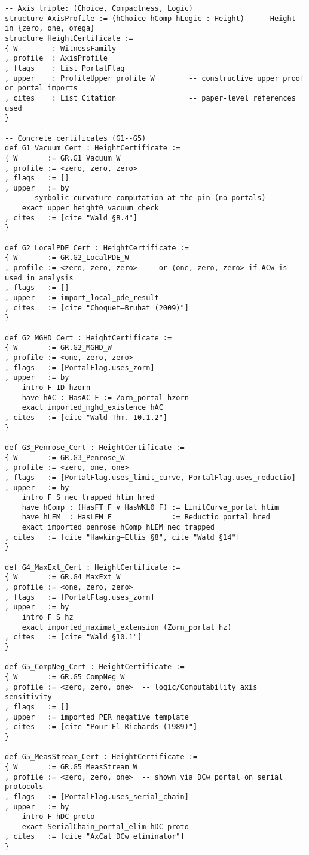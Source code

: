 \documentclass[11pt]{article}
\theoremstyle{definition}
\theoremstyle{remark}
\begin{document}
\begin{verbatim}
-- Axis triple: (Choice, Compactness, Logic)
structure AxisProfile := (hChoice hComp hLogic : Height)   -- Height in {zero, one, omega}
structure HeightCertificate :=
{ W        : WitnessFamily
, profile  : AxisProfile
, flags    : List PortalFlag
, upper    : ProfileUpper profile W        -- constructive upper proof or portal imports
, cites    : List Citation                 -- paper-level references used
}

-- Concrete certificates (G1--G5)
def G1_Vacuum_Cert : HeightCertificate :=
{ W       := GR.G1_Vacuum_W
, profile := <zero, zero, zero>
, flags   := []
, upper   := by
    -- symbolic curvature computation at the pin (no portals)
    exact upper_height0_vacuum_check
, cites   := [cite "Wald §B.4"]
}

def G2_LocalPDE_Cert : HeightCertificate :=
{ W       := GR.G2_LocalPDE_W
, profile := <zero, zero, zero>  -- or ⟨one, zero, zero> if ACw is used in analysis
, flags   := []
, upper   := import_local_pde_result
, cites   := [cite "Choquet–Bruhat (2009)"]
}

def G2_MGHD_Cert : HeightCertificate :=
{ W       := GR.G2_MGHD_W
, profile := <one, zero, zero>
, flags   := [PortalFlag.uses_zorn]
, upper   := by
    intro F ID hzorn
    have hAC : HasAC F := Zorn_portal hzorn
    exact imported_mghd_existence hAC
, cites   := [cite "Wald Thm. 10.1.2"]
}

def G3_Penrose_Cert : HeightCertificate :=
{ W       := GR.G3_Penrose_W
, profile := <zero, one, one>
, flags   := [PortalFlag.uses_limit_curve, PortalFlag.uses_reductio]
, upper   := by
    intro F S nec trapped hlim hred
    have hComp : (HasFT F ∨ HasWKL0 F) := LimitCurve_portal hlim
    have hLEM  : HasLEM F              := Reductio_portal hred
    exact imported_penrose hComp hLEM nec trapped
, cites   := [cite "Hawking–Ellis §8", cite "Wald §14"]
}

def G4_MaxExt_Cert : HeightCertificate :=
{ W       := GR.G4_MaxExt_W
, profile := <one, zero, zero>
, flags   := [PortalFlag.uses_zorn]
, upper   := by
    intro F S hz
    exact imported_maximal_extension (Zorn_portal hz)
, cites   := [cite "Wald §10.1"]
}

def G5_CompNeg_Cert : HeightCertificate :=
{ W       := GR.G5_CompNeg_W
, profile := <zero, zero, one>  -- logic/Computability axis sensitivity
, flags   := []
, upper   := imported_PER_negative_template
, cites   := [cite "Pour–El–Richards (1989)"]
}

def G5_MeasStream_Cert : HeightCertificate :=
{ W       := GR.G5_MeasStream_W
, profile := <zero, zero, one>  -- shown via DCw portal on serial protocols
, flags   := [PortalFlag.uses_serial_chain]
, upper   := by
    intro F hDC proto
    exact SerialChain_portal_elim hDC proto
, cites   := [cite "AxCal DCw eliminator"]
}
\end{verbatim}
\end{document}
